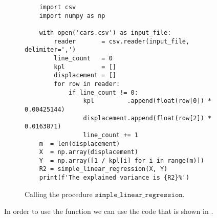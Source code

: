 \begin{figure}[!ht]
\centering
\begin{verbatim}
    import csv
    import numpy as np
    
    with open('cars.csv') as input_file:
        reader       = csv.reader(input_file, delimiter=',')
        line_count   = 0
        kpl          = []
        displacement = []
        for row in reader:
            if line_count != 0:
                kpl         .append(float(row[0]) * 0.00425144) 
                displacement.append(float(row[2]) * 0.0163871)
                line_count += 1
    m  = len(displacement)
    X  = np.array(displacement)
    Y  = np.array([1 / kpl[i] for i in range(m)])
    R2 = simple_linear_regression(X, Y)
    print(f'The explained variance is {R2}%')
\end{verbatim}
\vspace*{-0.3cm}
\caption{Calling the procedure $\mathtt{simple\_linear\_regression}$.}
\label{fig:simple_linear_regression.py:test}
\end{figure}
In order to use the function we can use the code that is shown in 
.
